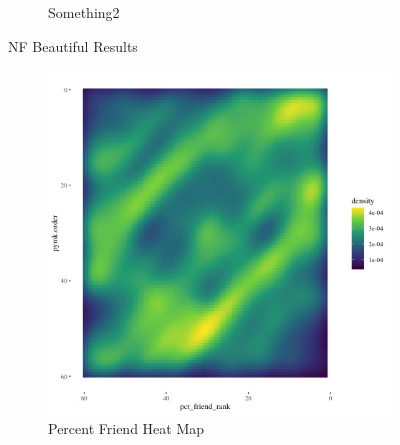 \documentclass[12pt,letterpaper]{article}
\begin{document}
\begin{figure}[ht]
\begin{subfigure}{.5\textwidth}
        \caption{Something2}
        \label{fig:sub-second}
    \end{subfigure}
\caption{NF Beautiful Results}
\end{figure}


\begin{figure}[ht]

    \begin{subfigure}{.5\textwidth} 
        \centering
        \includegraphics[width=1\linewidth]{Output/Graphs/Audit/Heatmaps/US PYMK pct friends by pymk rank - smooth.jpg}   
        \caption{Percent Friend Heat Map}
        \label{fig:sub-first}
        \end{subfigure}
    \begin{subfigure}{.5\textwidth}
        \centering

\end{subfigure}
\end{figure}
\end{document}

